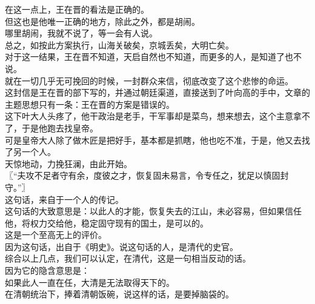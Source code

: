 \begin{multicols}{\theparacolNo}
在这一点上，王在晋的看法是正确的。\\

但这也是他唯一正确的地方，除此之外，都是胡闹。\\

哪里胡闹，我就不说了，等一会有人说。\\

总之，如按此方案执行，山海关破矣，京城丢矣，大明亡矣。\\

对于这一结果，王在晋不知道，天启自然也不知道，而更多的人，是知道了也不说。\\

就在一切几乎无可挽回的时候，一封群众来信，彻底改变了这个悲惨的命运。\\

这封信是王在晋的部下写的，并通过朝廷渠道，直接送到了叶向高的手中，文章的主题思想只有一条：王在晋的方案是错误的。\\

这下叶大人头疼了，他干政治是老手，干军事却是菜鸟，想来想去，这个主意拿不了，于是他跑去找皇帝。\\

可是皇帝大人除了做木匠是把好手，基本都是抓瞎，他也吃不准，于是，他又去找了另一个人。\\

天惊地动，力挽狂澜，由此开始。\\

〖“夫攻不足者守有余，度彼之才，恢复固未易言，令专任之，犹足以慎固封守。”〗\\

这句话，来自于一个人的传记。\\

这句话的大致意思是：以此人的才能，恢复失去的江山，未必容易，但如果信任他，将权力交给他，稳定固守现有的国土，是可以的。\\

这是一个至高无上的评价。\\

因为这句话，出自于《明史》。说这句话的人，是清代的史官。\\

综合以上几点，我们可以认定，在清代，这是一句相当反动的话。\\

因为它的隐含意思是：\\

如果此人一直在任，大清是无法取得天下的。\\

在清朝统治下，捧着清朝饭碗，说这样的话，是要掉脑袋的。\\


\end{multicols}
